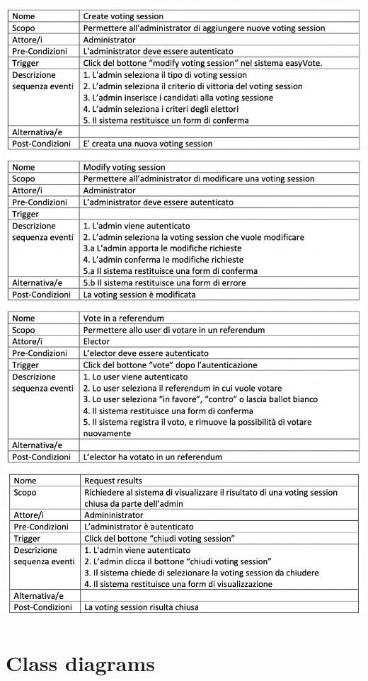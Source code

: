\documentclass[11pt, oneside]{article}   	%
\begin{document}
\begin{center}
\includegraphics[scale=1]{images/sceneryDescription2.png}
\includegraphics[scale=1]{images/sceneryDescription3.png}
\end{center}

\pagebreak

\section{Class diagrams}
\end{document}

